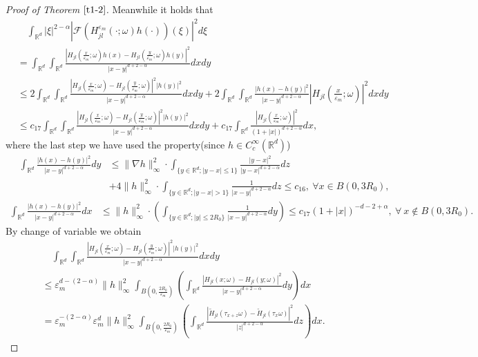 \documentclass[11pt,draft, reqno]{amsart}
\renewcommand{\le}{\leqslant}
\newcommand{\F}{\mathscr{F}}
\newcommand{\R}{\mathds R}
\newcommand{\e}{\varepsilon}
\newcommand{\w}{\omega}
\theoremstyle{definition}
\numberwithin{equation}{section}
\begin{document}
\begin{proof} [Proof of Theorem $\ref{t1-2}$]
Meanwhile it holds that
\begin{align*}
&\quad\int_{\R^d}|\xi|^{2-\alpha}\left|\F\left(H_{jl}^{\e_m}(\cdot;\w)h(\cdot)\right)(\xi)\right|^2d\xi\\
&=\int_{\R^d}\int_{\R^d}\frac{\left|H_{jl}\left(\frac{x}{\e_m};\w\right)h(x)-H_{jl}\left(\frac{y}{\e_m};\w\right)h(y)\right|^2}{|x-y|^{d+2-\alpha}}dxdy\\
&\le 2\int_{\R^d}\int_{\R^d}\frac{\left|H_{jl}\left(\frac{x}{\e_m};\w\right)-H_{jl}\left(\frac{y}{\e_m};\w\right)\right|^2|h(y)|^2}{|x-y|^{d+2-\alpha}}dxdy
+2\int_{\R^d}\int_{\R^d}\frac{|h(x)-h(y)|^2}{|x-y|^{d+2-\alpha}}\left|H_{jl}\left(\frac{x}{\e_m};\w\right)\right|^2dxdy\\
&\le c_{17}\int_{\R^d}\int_{\R^d}\frac{\left|H_{jl}\left(\frac{x}{\e_m};\w\right)-H_{jl}\left(\frac{y}{\e_m};\w\right)\right|^2|h(y)|^2}{|x-y|^{d+2-\alpha}}dxdy
+c_{17}\int_{\R^d}\frac{\left|H_{jl}\left(\frac{x}{\e_m};\w\right)\right|^2}{(1+|x|)^{d+2-\alpha}}dx,
\end{align*}
where the last step we have used the property(since $h\in C_c^\infty(\R^d)$)
\begin{align*}
\quad \int_{\R^d}\frac{\left|h(x)-h(y)\right|^2}{|x-y|^{d+2-\alpha}}dy
&\le \|\nabla h\|_\infty^2\cdot \int_{\{y\in \R^d; |y-x|\le 1\}}\frac{|y-x|^2}{|y-x|^{d+2-\alpha}}dz\\
&+4\|h\|_\infty^2 \cdot \int_{\{y\in \R^d;|y-x|>1\}}\frac{1}{|x-y|^{d+2-\alpha}}dz\le c_{16},\ \forall x\in B(0,3R_0),
\end{align*}
\begin{align*}
\int_{\R^d}\frac{\left|h(x)-h(y)\right|^2}{|x-y|^{d+2-\alpha}}dx
&\le \|h\|_\infty^2\cdot\left(\int_{\{y\in \R^d; |y|\le 2R_0\}}\frac{1}{|x-y|^{d+2-\alpha}}dy\right)\le c_{17}(1+|x|)^{-d-2+\alpha},\ \forall\ x\notin B(0,3R_0).
\end{align*}
By change of variable we obtain
\begin{align*}
&\quad \int_{\R^d}\int_{\R^d}\frac{\left|H_{jl}\left(\frac{x}{\e_m};\w\right)-H_{jl}\left(\frac{y}{\e_m};\w\right)\right|^2|h(y)|^2}{|x-y|^{d+2-\alpha}}dxdy\\
&\le
\e_m^{d-(2-\alpha)}\|h\|_\infty^2\int_{B\left(0,\frac{2R_0}{\e_m}\right)}\left(\int_{\R^d}\frac{\left|H_{jl}\left(x;\w\right)-H_{jl}\left(y;\w\right)\right|^2}{|x-y|^{d+2-\alpha}}dy\right)dx\\
&=\e_m^{-(2-\alpha)}\e_m^d\|h\|_\infty^2\int_{B\left(0,\frac{2R_0}{\e_m}\right)}
\left(\int_{\R^d}\frac{\left|\tilde H_{jl}(\tau_{x+z}\w)-\tilde H_{jl}(\tau_{x}\w)\right|^2}{|z|^{d+2-\alpha}}dz\right)dx.

\end{align*}
\end{proof}
\end{document}
